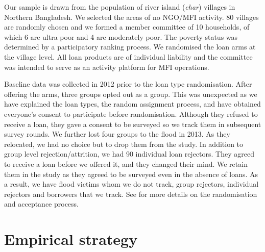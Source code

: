 	
	Our sample is drawn from the population of river island (\textit{char}) villages in Northern Bangladesh. We selected the areas of no NGO/MFI activity. 80 villages are randomly chosen and we formed a member committee of 10 households, of which 6 are ultra poor and 4 are moderately poor. The poverty status was determined by a participatory ranking process. We randomised the loan arms at the village level. All loan products are of individual liability and the committee was intended to serve as an activity platform for MFI operations. 

	Baseline data was collected in 2012 prior to the loan type randomisation. After offering the arms, three groups opted out as a group. This was unexpected as we have explained the loan types, the random assignment process, and have obtained everyone's consent to participate before randomisation. Although they refused to receive a loan, they gave a consent to be surveyed so we track them in subsequent survey rounds. We further lost four groups to the flood in 2013. As they relocated, we had no choice but to drop them from the study. In addition to group level rejection/attrition, we had 90 individual loan rejectors. They agreed to receive a loan before we offered it, and they changed their mind. We retain them in the study as they agreed to be surveyed even in the absence of loans. %
As a result, we have flood victims whom we do not track, group rejectors, individual rejectors and borrowers that we track. See \citet{GUK2016} for more details on the randomisation and acceptance process.

\section{Empirical strategy}
\label{SecEmpiricalStrategy}

